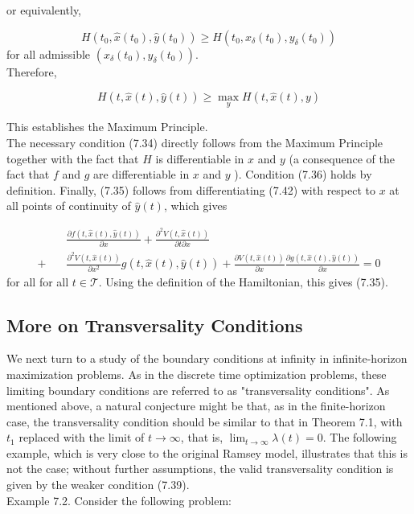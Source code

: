 \documentclass[\topdir/lecture_notes.tex]{subfiles}
\begin{document}
or equivalently,

\[
H\left(t_{0}, \hat{x}\left(t_{0}\right), \hat{y}\left(t_{0}\right)\right) \geq H\left(t_{0}, x_{\delta}\left(t_{0}\right), y_{\delta}\left(t_{0}\right)\right)
\]
for all admissible $\left(x_{\delta}\left(t_{0}\right), y_{\delta}\left(t_{0}\right)\right)$.\\
Therefore,

\[
H(t, \hat{x}(t), \hat{y}(t)) \geq \max _{y} H(t, \hat{x}(t), y)
\]

This establishes the Maximum Principle.\\
The necessary condition (7.34) directly follows from the Maximum Principle together with the fact that $H$ is differentiable in $x$ and $y$ (a consequence of the fact that $f$ and $g$ are differentiable in $x$ and $y$ ). Condition (7.36) holds by definition. Finally, (7.35) follows from differentiating (7.42) with respect to $x$ at all points of continuity of $\hat{y}(t)$, which gives

\[
\begin{aligned}
& \frac{\partial f(t, \hat{x}(t), \hat{y}(t))}{\partial x}+\frac{\partial^{2} V(t, \hat{x}(t))}{\partial t \partial x} \\
+\quad & \frac{\partial^{2} V(t, \hat{x}(t))}{\partial x^{2}} g(t, \hat{x}(t), \hat{y}(t))+\frac{\partial V(t, \hat{x}(t))}{\partial x} \frac{\partial g(t, \hat{x}(t), \hat{y}(t))}{\partial x}=0
\end{aligned}
\]
for all for all $t \in \mathcal{T}$. Using the definition of the Hamiltonian, this gives (7.35).

\subsection{More on Transversality Conditions}
We next turn to a study of the boundary conditions at infinity in infinite-horizon maximization problems. As in the discrete time optimization problems, these limiting boundary conditions are referred to as "transversality conditions". As mentioned above, a natural conjecture might be that, as in the finite-horizon case, the transversality condition should be similar to that in Theorem 7.1, with $t_1$ replaced with the limit of $t \rightarrow \infty$, that is, $\lim _{t \rightarrow \infty} \lambda(t)=0$. The following example, which is very close to the original Ramsey model, illustrates that this is not the case; without further assumptions, the valid transversality condition is given by the weaker condition (7.39).\\
Example 7.2. Consider the following problem:
\end{document}
